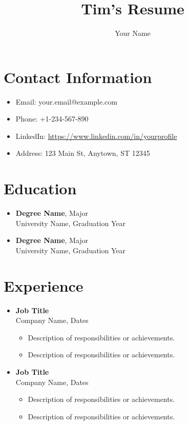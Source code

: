 \documentclass[a4paper,10pt]{article}
\title{Tim's Resume}
\author{Your Name}
\date{} %
\begin{document}
\maketitle

\section*{Contact Information}
\begin{itemize}
    \item Email: your.email@example.com
    \item Phone: +1-234-567-890
    \item LinkedIn: \url{https://www.linkedin.com/in/yourprofile}
    \item Address: 123 Main St, Anytown, ST 12345
\end{itemize}

\section*{Education}
\begin{itemize}
    \item \textbf{Degree Name}, Major \\
    University Name, Graduation Year
    \item \textbf{Degree Name}, Major \\
    University Name, Graduation Year
\end{itemize}

\section*{Experience}
\begin{itemize}
    \item \textbf{Job Title} \\
    Company Name, Dates \\
    \begin{itemize}
        \item Description of responsibilities or achievements.
        \item Description of responsibilities or achievements.
    \end{itemize}
    
    \item \textbf{Job Title} \\
    Company Name, Dates \\
    \begin{itemize}
        \item Description of responsibilities or achievements.
        \item Description of responsibilities or achievements.
    \end{itemize}
\end{itemize}
\end{document}
